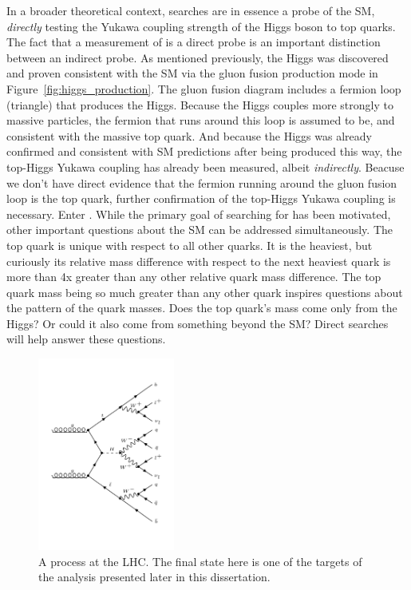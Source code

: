 In a broader theoretical context, \tth searches are in essence a probe of the SM, \emph{directly} testing the Yukawa coupling strength of the Higgs boson to top quarks. The fact that a
measurement of \tth is a direct probe is an important distinction between an indirect probe. As mentioned previously, the Higgs was discovered and proven
consistent with the SM via the gluon fusion production mode in Figure~\ref{fig:higgs_production}. The gluon fusion diagram includes a fermion loop (triangle)
that produces the Higgs. Because the Higgs couples more strongly to massive particles, the fermion that runs around this loop is assumed to be, and consistent
with the massive top quark. And
because the Higgs was already confirmed and consistent with SM predictions after being produced this way, the top-Higgs Yukawa coupling has already been
measured, albeit \emph{indirectly}. Beacuse we don't have direct evidence that the fermion running around the gluon fusion loop is the top quark, further
confirmation of the top-Higgs Yukawa coupling is necessary. Enter \tth. While the primary goal of searching for \tth has been motivated,
other important questions about the SM can be addressed simultaneously. The top quark is unique with respect to all other quarks. It is the heaviest, but curiously
its relative mass difference with respect to the next heaviest quark is more than 4x greater than any other relative quark mass difference. The top quark mass
being so much greater than any other quark inspires questions about the pattern of the quark masses. Does the top quark's mass come only from the Higgs? Or could
it also come from something beyond the SM? Direct \tth searches will help answer these questions. 

\begin{figure}[hbtp]
 \begin{center}
   \includegraphics[width=0.4\textwidth]{ch2_figs/feynman_diagram_ttH_HWW_2lss.pdf}
   \caption{A \tth process at the LHC. The final state here is one of the targets of the analysis presented later in this dissertation.}
   \label{fig:tth_example_diagram}
 \end{center}
\end{figure}

